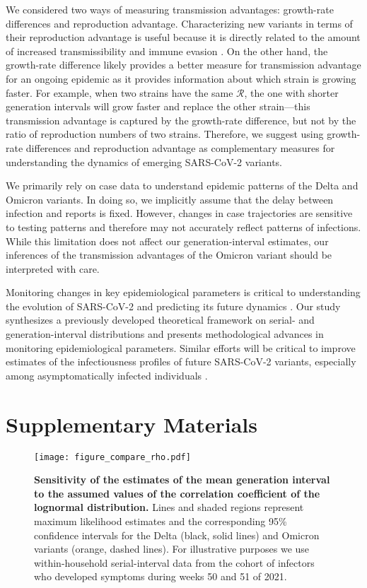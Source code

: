 \documentclass[12pt]{article}
\newcommand{\RR}{\ensuremath{{\mathcal R}}\xspace}
\begin{document}
We considered two ways of measuring transmission advantages: growth-rate differences and reproduction advantage.
Characterizing new variants in terms of their reproduction advantage is useful because it is directly related to the amount of increased transmissibility and immune evasion \citep{pearson2021bounding}.
On the other hand, the growth-rate difference likely provides a better measure for transmission advantage for an ongoing epidemic as it provides information about which strain is growing faster.
For example, when two strains have the same $\RR$, the one with shorter generation intervals will grow faster and replace the other strain---this transmission advantage is captured by the growth-rate difference, but not by the ratio of reproduction numbers of two strains.
Therefore, we suggest using growth-rate differences and reproduction advantage as complementary measures for understanding the dynamics of emerging SARS-CoV-2 variants.

We primarily rely on case data to understand epidemic patterns of the Delta and Omicron variants.
In doing so, we implicitly assume that the delay between infection and reports is fixed.
However, changes in case trajectories are sensitive to testing patterns and therefore may not accurately reflect patterns of infections.
While this limitation does not affect our generation-interval estimates, our inferences of the transmission advantages of the Omicron variant should be interpreted with care.

Monitoring changes in key epidemiological parameters is critical to understanding the evolution of SARS-CoV-2 and predicting its future dynamics \citep{kraemer2021monitoring}.
Our study synthesizes a previously developed theoretical framework on serial- and generation-interval distributions and presents methodological advances in monitoring epidemiological parameters.
Similar efforts will be critical to improve estimates of the infectiousness profiles of future SARS-CoV-2 variants, especially among asymptomatically infected individuals \citep{park2020time}.

\pagebreak

\section*{Supplementary Materials}
\setcounter{figure}{0}
\renewcommand{\thefigure}{S\arabic{figure}}

\begin{figure}[!th]
\texttt{[image: figure\_compare\_rho.pdf]}
\caption{
\textbf{Sensitivity of the estimates of the mean generation interval to the assumed values of the correlation coefficient of the lognormal distribution.}
Lines and shaded regions represent maximum likelihood estimates and the corresponding 95\% confidence intervals for the Delta (black, solid lines) and Omicron variants (orange, dashed lines).
For illustrative purposes we use within-household serial-interval data from the cohort of infectors who developed symptoms during weeks 50 and 51 of 2021.
}
\end{figure}
\end{document}
